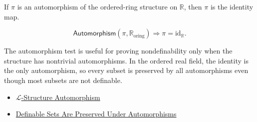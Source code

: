 \begin{remark*}
If $\pi$ is an automorphism of the ordered-ring structure on $\mathbb{R}$,
then $\pi$ is the identity map.
\end{remark*}

\begin{remark*}
\[
\mathsf{Automorphism}(\pi,\mathbb{R}_{\mathrm{oring}})
\Longrightarrow
\pi=\mathrm{id}_{\mathbb{R}}.
\]
\end{remark*}

\begin{remark*}[Interpretation]
The automorphism test is useful for proving nondefinability only when the
structure has nontrivial automorphisms. In the ordered real field, the identity
is the only automorphism, so every subset is preserved by all automorphisms
even though most subsets are not definable.
\end{remark*}

\begin{dependencies}
\begin{itemize}
  \item \hyperref[def:l-structure-automorphism]{$\mathcal{L}$-Structure Automorphism}
  \item \hyperref[prop:definable-sets-preserved-under-automorphisms]{Definable Sets Are Preserved Under Automorphisms}
\end{itemize}
\end{dependencies}
